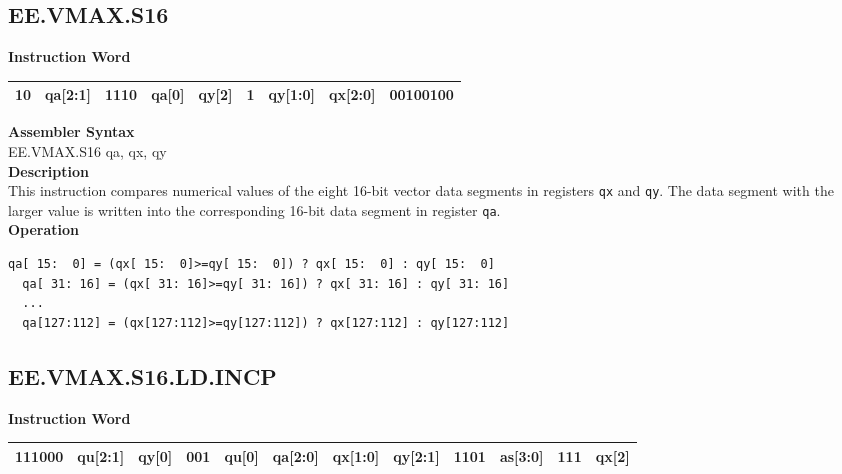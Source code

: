 \clearpage
\subsection{EE.VMAX.S16}\label{instruction:EEVMAXS16}
\setlength\tabcolsep{6pt}
\textbf{Instruction Word} \\
\begin{tabular}{|c|c|c|c|c|c|c|c|c|}
	\hline
	10 & qa[2:1] & 1110 & qa[0] & qy[2] & 1 & qy[1:0] & qx[2:0] & 00100100 \\
	\hline
\end{tabular}

\textbf{Assembler Syntax} \\
EE.VMAX.S16 qa, qx, qy \\
\textbf{Description} \\
This instruction compares numerical values of the eight 16-bit vector data segments in registers \lstinline{qx} and \lstinline{qy}. The data segment with the larger value is written into the corresponding 16-bit data segment in register \lstinline{qa}.\\
\textbf{Operation}
\begin{lstlisting}[escapeinside=`?]
  qa[ 15:  0] = (qx[ 15:  0]>=qy[ 15:  0]) ? qx[ 15:  0] : qy[ 15:  0]
  qa[ 31: 16] = (qx[ 31: 16]>=qy[ 31: 16]) ? qx[ 31: 16] : qy[ 31: 16]
  ...
  qa[127:112] = (qx[127:112]>=qy[127:112]) ? qx[127:112] : qy[127:112]
\end{lstlisting}

\clearpage
\subsection{EE.VMAX.S16.LD.INCP}\label{instruction:EEVMAXS16LDINCP}
\setlength\tabcolsep{6pt}
\textbf{Instruction Word} \\
\begin{tabular}{|c|c|c|c|c|c|c|c|c|c|c|c|}
	\hline
	111000 & qu[2:1] & qy[0] & 001 & qu[0] & qa[2:0] & qx[1:0] & qy[2:1] & 1101 & as[3:0] & 111 & qx[2] \\
	\hline
\end{tabular}

